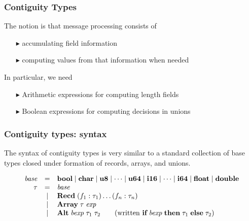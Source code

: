 \documentclass{beamer}
\newcommand{\konst}[1]{\ensuremath{\mbox{\bf{#1}}}}
\begin{document}



\begin{frame}[fragile]\frametitle{Contiguity Types}

The notion is that message processing consists of

\begin{itemize}
\item [$\blacktriangleright$] accumulating field information
\item [$\blacktriangleright$] computing values from that information when needed
\end{itemize}

In particular, we need

\begin{itemize}
\item [$\blacktriangleright$] Arithmetic expressions for computing length fields
\item [$\blacktriangleright$] Boolean expressions for computing decisions in unions
\end{itemize}

\end{frame}

\begin{frame}[fragile]\frametitle{Contiguity types: syntax}

The syntax of contiguity types is very similar to a standard
collection of base types closed under formation of records, arrays,
and unions.

\[
\begin{array}{rcl}
 \mathit{base} & = & \konst{bool} \mid \konst{char} \mid \konst{u8} \mid \cdots \mid \konst{u64}  \mid \konst{i16} \mid \cdots \mid \konst{i64} \mid \konst{float} \mid \konst{double} \\
 \tau & = & \mathit{base} \\
      & \mid & \konst{Recd}\; (f_1 : \tau_1) \ldots (f_n : \tau_n) \\
      & \mid & \konst{Array}\; \tau \; \mathit{exp} \\
      & \mid & \konst{Alt}\; \mathit{bexp}\; \tau_1 \; \tau_2 \qquad (\text{written}\ \konst{if}\;\mathit{bexp}\;\konst{then}\;\tau_1\;\konst{else}\; \tau_2)
\end{array}
\]

\end{frame}
\end{document}

